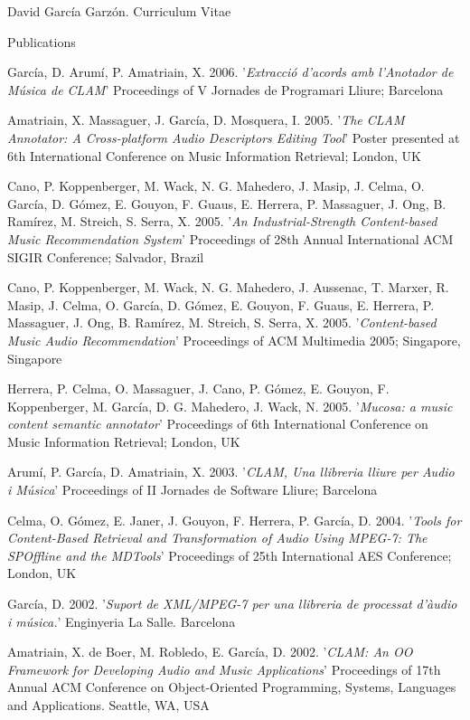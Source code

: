 \documentclass{article}
\begin{document}
\begin{cv}{David García Garzón. Curriculum Vitae}
\begin{cvlist}{Publications}
\item[] {\sc García, D. Arumí, P. Amatriain, X.} 2006.
'{\em Extracció d'acords amb l'Anotador de Música de CLAM}'
Proceedings of V Jornades de Programari Lliure; Barcelona

\item[] {\sc Amatriain, X. Massaguer, J. García, D. Mosquera, I.} 2005.
'{\em The CLAM Annotator: A Cross-platform Audio Descriptors Editing Tool}'
Poster presented at 6th International Conference on Music Information Retrieval; London, UK

\item[] {\sc Cano, P. Koppenberger, M. Wack, N. G. Mahedero, J. Masip, J. Celma, O. García, D. Gómez, E. Gouyon, F. Guaus, E. Herrera, P. Massaguer, J. Ong, B. Ramírez, M. Streich, S. Serra, X.} 2005.
'{\em An Industrial-Strength Content-based Music Recommendation System}'
Proceedings of 28th Annual International ACM SIGIR Conference; Salvador, Brazil

\item[] {\sc Cano, P. Koppenberger, M. Wack, N. G. Mahedero, J. Aussenac, T. Marxer, R. Masip, J. Celma, O. García, D. Gómez, E. Gouyon, F. Guaus, E. Herrera, P. Massaguer, J. Ong, B. Ramírez, M. Streich, S. Serra, X.} 2005.
'{\em Content-based Music Audio Recommendation}'
Proceedings of ACM Multimedia 2005; Singapore, Singapore

\item[] {\sc Herrera, P. Celma, O. Massaguer, J. Cano, P. Gómez, E. Gouyon, F. Koppenberger, M. García, D. G. Mahedero, J. Wack, N.} 2005.
'{\em Mucosa: a music content semantic annotator}'
Proceedings of 6th International Conference on Music Information Retrieval; London, UK

\item[] {\sc Arumí, P. García, D. Amatriain, X.} 2003.
'{\em CLAM, Una llibreria lliure per Audio i Música}'
Proceedings of II Jornades de Software Lliure; Barcelona

\item[] {\sc Celma, O. Gómez, E. Janer, J. Gouyon, F. Herrera, P. García, D.} 2004.
'{\em Tools for Content-Based Retrieval and Transformation of Audio Using MPEG-7: The SPOffline and the MDTools}'
Proceedings of 25th International AES Conference; London, UK

\item[] {\sc García, D.} 2002.
'{\em Suport de XML/MPEG-7 per una llibreria de processat d'àudio i música.}'
Enginyeria La Salle. Barcelona

\item[] {\sc Amatriain, X. de Boer, M. Robledo, E. García, D.} 2002.
'{\em CLAM: An OO Framework for Developing Audio and Music Applications}'
Proceedings of 17th Annual ACM Conference on Object-Oriented Programming, Systems, Languages and Applications. Seattle, WA, USA


\end{cvlist}
\end{cv}
\end{document}
